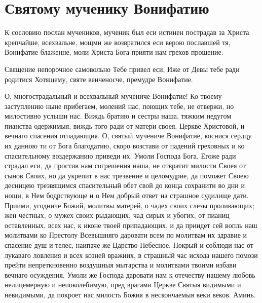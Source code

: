 
 

\section{Святому мученику Вонифатию}
 




К сословию послан мучеников, мученик был еси истинен пострадав за Христа крепчайше, всехвальне, мощми же возвратился еси верою пославшей тя, Вонифатие блаженне, моли Христа Бога прияти нам грехов прощение.




Священие непорочное самовольно Тебе привел еси, Иже от Девы тебе ради родитися Хотящему, святе венченосче, премудре Вонифатие.




О, многострадальный и всехвальный мучениче Вонифатие! Ко твоему заступлению ныне прибегаем, молений нас, поющих тебе, не отвержи, но милостивно услыши нас. Виждь братию и сестры наша, тяжким недугом пианства одержимыя, виждь того ради от матери своея, Церкве Христовой, и вечнаго спасения отпадающия. О, святый мучениче Вонифатие, коснися сердцу их данною ти от Бога благодатию, скоро возстави от падений греховных и ко спасительному воздержанию приведи их. Умоли Господа Бога, Егоже ради страдал еси, да простив нам согрешения наша, не отвратит милости Своея от сынов Своих, но да укрепит в нас трезвение и целомудрие, да поможет Своею десницею трезвящимся спасительный обет свой до конца сохранити во дни и нощи, в Нем бодрствующе и о Нем добрый ответ на страшное судилище дати. Приими, угодниче Божий, молитвы матерей, о чадех своих слезы проливающих; жен честных, о мужех своих рыдающих, чад сирых и убогих, от пианиц оставленных, всех нас, к иконе твоей припадающих, и да приидет сей вопль наш молитвами ко Престолу Всевышняго даровати всем по молитвам их здравие и спасение душ и телес, наипаче же Царство Небесное. Покрый и соблюди нас от лукаваго ловления и всех козней вражиих, в страшный час исхода нашего помози прейти непреткновенно воздушныя мытарства и молитвами твоими избави вечнаго осуждения. Умоли же Господа даровати нам к отечеству нашему любовь нелицемерную и непоколебимую, пред врагами Церкве Святыя видимыми и невидимыми, да покроет нас милость Божия в нескончаемыя веки веков. Аминь.


